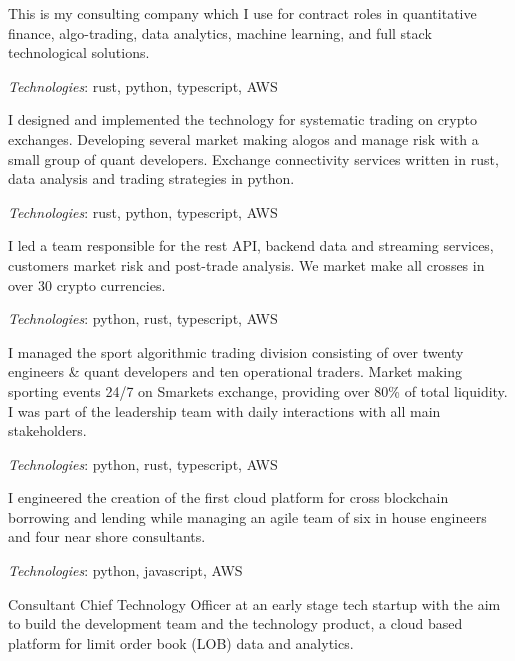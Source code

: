 
This is my consulting company which I use for contract roles in quantitative finance,
algo-trading, data analytics, machine learning, and full stack technological solutions.

{\it Technologies}: rust, python, typescript, AWS


I designed and implemented the technology for systematic trading on crypto exchanges.
Developing several market making alogos and manage risk with a small group of quant developers.
Exchange connectivity services written in rust, data analysis and trading strategies in python.

{\it Technologies}: rust, python, typescript, AWS


I led a team responsible for the rest API,
backend data and streaming services, customers market risk and post-trade analysis.
We market make all crosses in over 30 crypto currencies.

{\it Technologies}: python, rust, typescript, AWS


I managed the sport algorithmic trading division consisting of over twenty engineers \& quant developers and ten operational traders.
Market making sporting events 24/7 on Smarkets exchange, providing over 80\% of total liquidity.
I was part of the leadership team with daily interactions with all main stakeholders.

{\it Technologies}: python, rust, typescript, AWS


I engineered the creation of the first cloud platform for cross blockchain borrowing and lending
while managing an agile team of six in house engineers and four near shore consultants.

{\it Technologies}: python, javascript, AWS



Consultant Chief Technology Officer at an early stage tech startup with the aim to build the development team and the technology product,
a cloud based platform for limit order book (LOB) data and analytics.

